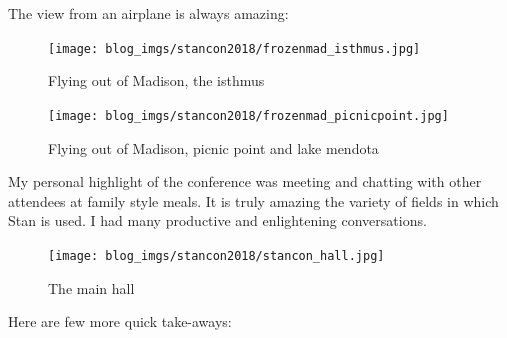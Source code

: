 \documentclass{article}
\begin{document}
The view from an airplane is always amazing:

\begin{figure}[htbp]
\centering
\texttt{[image: blog\_imgs/stancon2018/frozenmad\_isthmus.jpg]}
\caption{Flying out of Madison, the isthmus}
\end{figure}

\begin{figure}[htbp]
\centering
\texttt{[image: blog\_imgs/stancon2018/frozenmad\_picnicpoint.jpg]}
\caption{Flying out of Madison, picnic point and lake mendota}
\end{figure}


My personal highlight of the conference was meeting and chatting with
other attendees at family style meals.  It is truly amazing the
variety of fields in which Stan is used.  I had many productive and
enlightening conversations.


\begin{figure}[htbp]
\centering
\texttt{[image: blog\_imgs/stancon2018/stancon\_hall.jpg]}
\caption{The main hall}
\end{figure}

Here are few more quick take-aways:
\end{document}
